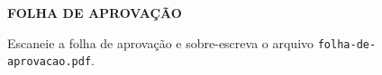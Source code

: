 \begin{center}
  {\Large \textbf{FOLHA DE APROVAÇÃO}
  }
\end{center}





Escaneie a folha de aprovação e
sobre-escreva o arquivo \verb+folha-de-aprovacao.pdf+.

